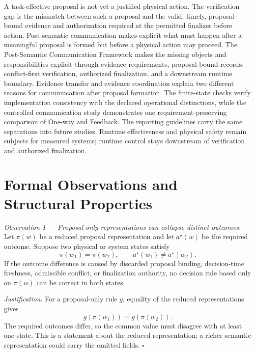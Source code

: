 A task-effective proposal is not yet a justified physical action. The
verification gap is the mismatch between such a proposal and the valid, timely,
proposal-bound evidence and authorization required at the permitted finalizer
before action. Post-semantic communication makes explicit what must happen after
a meaningful proposal is formed but before a physical action may proceed. The
Post-Semantic Communication Framework makes the missing objects and
responsibilities explicit through evidence requirements, proposal-bound
records, conflict-first verification, authorized finalization, and a downstream
runtime boundary. Evidence transfer and evidence coordination explain two
different reasons for communication after proposal formation. The finite-state
checks verify implementation consistency with the declared operational
distinctions, while the controlled communication study demonstrates one
requirement-preserving comparison of One-way and Feedback. The reporting
guidelines carry the same separations into future
studies. Runtime effectiveness and physical safety remain subjects for measured
systems; runtime control stays downstream of verification and authorized
finalization.

\appendices

\section{Formal Observations and Structural Properties}

\emph{Observation 1 --- Proposal-only representations can collapse distinct
outcomes.} Let $\pi(w)$ be a reduced proposal representation and let
$a^\star(w)$ be the required outcome. Suppose two physical or system states
satisfy
\begin{equation}
\pi(w_1)=\pi(w_2),\qquad a^\star(w_1)\ne a^\star(w_2).
\end{equation}
If the outcome difference is caused by discarded proposal binding,
decision-time freshness, admissible conflict, or finalization authority, no
decision rule based only on $\pi(w)$ can be correct in both states.

\emph{Justification.} For a proposal-only rule $g$, equality of the reduced
representations gives
\begin{equation}
g(\pi(w_1))=g(\pi(w_2)).
\end{equation}
The required outcomes differ, so the common value must disagree with at least
one state. This is a statement about the reduced representation; a richer
semantic representation could carry the omitted fields. \hfill$\square$

